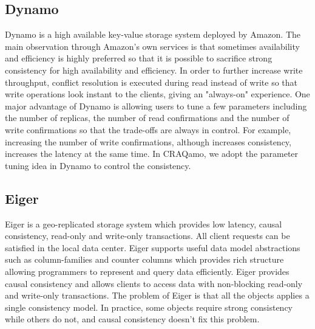 \subsection{Dynamo}
Dynamo\cite{decandia2007dynamo} is a high available key-value storage system deployed by Amazon. The main observation through Amazon's own services is that sometimes availability and efficiency is highly preferred so that it is possible to sacrifice strong consistency for high availability and efficiency. In order to further increase write throughput, conflict resolution is executed during read instead of write so that write operations look instant to the clients, giving an "always-on" experience. One major advantage of Dynamo is allowing users to tune a few parameters including the number of replicas, the number of read confirmations and the number of write confirmations so that the trade-offs are always in control. For example, increasing the number of write confirmations, although increases consistency, increases the latency at the same time. In CRAQamo, we adopt the parameter tuning idea in Dynamo to control the consistency. 

\subsection{Eiger}
Eiger\cite{lloyd2013stronger} is a geo-replicated storage system which provides low latency, causal consistency, read-only and write-only transactions. All client requests can be satisfied in the local data center. Eiger supports useful data model abstractions such as column-families and counter columns which provides rich structure allowing programmers to represent and query data efficiently. Eiger provides causal consistency and allows clients to access data with non-blocking read-only and write-only transactions. The problem of Eiger is that all the objects applies a single consistency model. In practice, some objects require strong consistency while others do not, and causal consistency doesn't fix this problem. 
\label{sec:related}

